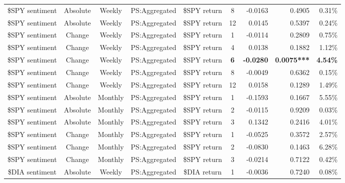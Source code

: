 \begin{longtable}{ccccccrrrrr}
    \$SPY sentiment & Absolute & Weekly & PS:Aggregated & \$SPY return & 8     & -0.0163 & \multicolumn{2}{r}{0.4905} & \multicolumn{2}{r}{0.31\%} \\
    \$SPY sentiment & Absolute & Weekly & PS:Aggregated & \$SPY return & 12    & 0.0145 & \multicolumn{2}{r}{0.5397} & \multicolumn{2}{r}{0.24\%} \\
    \$SPY sentiment & Change & Weekly & PS:Aggregated & \$SPY return & 1     & -0.0114 & \multicolumn{2}{r}{0.2809} & \multicolumn{2}{r}{0.75\%} \\
    \$SPY sentiment & Change & Weekly & PS:Aggregated & \$SPY return & 4     & 0.0138 & \multicolumn{2}{r}{0.1882} & \multicolumn{2}{r}{1.12\%} \\
    \$SPY sentiment & Change & Weekly & PS:Aggregated & \$SPY return & \textbf{6} & \textbf{-0.0280} & \multicolumn{2}{r}{\textbf{0.0075***}} & \multicolumn{2}{r}{\textbf{4.54\%}} \\
    \$SPY sentiment & Change & Weekly & PS:Aggregated & \$SPY return & 8     & -0.0049 & \multicolumn{2}{r}{0.6362} & \multicolumn{2}{r}{0.15\%} \\
    \$SPY sentiment & Change & Weekly & PS:Aggregated & \$SPY return & 12    & 0.0158 & \multicolumn{2}{r}{0.1289} & \multicolumn{2}{r}{1.49\%} \\
    \$SPY sentiment & Absolute & Monthly & PS:Aggregated & \$SPY return & 1     & -0.1593 & \multicolumn{2}{r}{0.1667} & \multicolumn{2}{r}{5.55\%} \\
    \$SPY sentiment & Absolute & Monthly & PS:Aggregated & \$SPY return & 2     & -0.0115 & \multicolumn{2}{r}{0.9209} & \multicolumn{2}{r}{0.03\%} \\
    \$SPY sentiment & Absolute & Monthly & PS:Aggregated & \$SPY return & 3     & 0.1342 & \multicolumn{2}{r}{0.2416} & \multicolumn{2}{r}{4.01\%} \\
    \$SPY sentiment & Change & Monthly & PS:Aggregated & \$SPY return & 1     & -0.0525 & \multicolumn{2}{r}{0.3572} & \multicolumn{2}{r}{2.57\%} \\
    \$SPY sentiment & Change & Monthly & PS:Aggregated & \$SPY return & 2     & -0.0830 & \multicolumn{2}{r}{0.1463} & \multicolumn{2}{r}{6.28\%} \\
    \$SPY sentiment & Change & Monthly & PS:Aggregated & \$SPY return & 3     & -0.0214 & \multicolumn{2}{r}{0.7122} & \multicolumn{2}{r}{0.42\%} \\
    \$DIA sentiment & Absolute & Weekly & PS:Aggregated & \$DIA return & 1     & -0.0036 & \multicolumn{2}{r}{0.7240} & \multicolumn{2}{r}{0.08\%} \\

\end{longtable}
